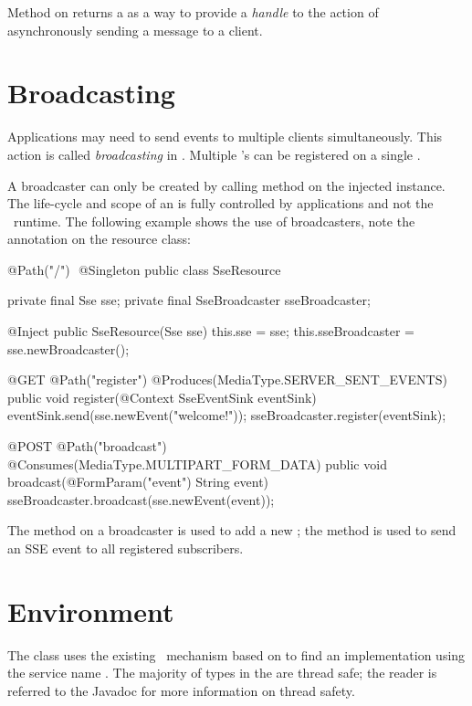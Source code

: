 Method  on  returns a  as a way to provide a \emph{handle} to the action of asynchronously sending a message to a client.

\section{Broadcasting}
\label{sse_broadcasting}

Applications may need to send events to multiple clients simultaneously. This action is called \emph{broadcasting} in \jaxrs. Multiple 's can be registered on a single . 

A broadcaster can only be created by calling method  on the injected  instance. The life-cycle and scope of an  is fully controlled by applications and not the \jaxrs\ runtime. The following example shows the use of broadcasters, note the  annotation on the resource class:

\begin{listing}{1}
@Path("/") 
@Singleton
public class SseResource {
	
  private final Sse sse;
  private final SseBroadcaster sseBroadcaster;
	
  @Inject
  public SseResource(Sse sse) {
    this.sse = sse;
    this.sseBroadcaster = sse.newBroadcaster();
  }  
	
  @GET
  @Path("register")
  @Produces(MediaType.SERVER_SENT_EVENTS)
  public void register(@Context SseEventSink eventSink) {
    eventSink.send(sse.newEvent("welcome!"));
    sseBroadcaster.register(eventSink);
  }  
	
  @POST
  @Path("broadcast")
  @Consumes(MediaType.MULTIPART_FORM_DATA)
  public void broadcast(@FormParam("event") String event) { 
    sseBroadcaster.broadcast(sse.newEvent(event));
  } 
}
\end{listing}

The  method on a broadcaster is used to add a new ; the
 method is used to send an SSE event to all registered subscribers.

\section{Environment}
\label{sse_environment}

The  class uses the existing \jaxrs\ mechanism based on  to find an implementation using the service name . The majority of types in the  are thread safe; the reader is referred to the Javadoc for more information on thread safety.


